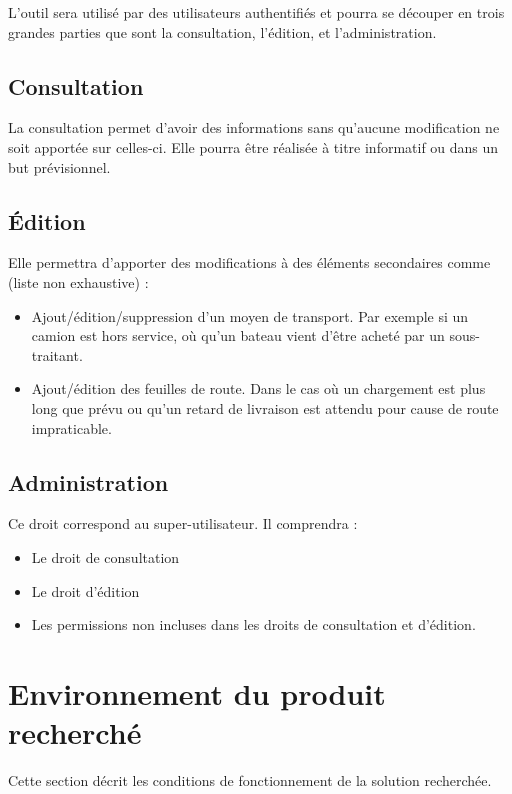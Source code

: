 L'outil sera utilisé par des utilisateurs authentifiés et pourra se découper en trois grandes parties que sont la consultation, l'édition, et l'administration.

\subsection{Consultation}
La consultation permet d'avoir des informations sans qu'aucune modification ne soit apportée sur celles-ci. Elle pourra être réalisée à titre informatif ou dans un but prévisionnel.

\subsection{Édition}
Elle permettra d'apporter des modifications à des éléments secondaires comme (liste non exhaustive) :
\begin{itemize}
\item Ajout/édition/suppression d'un moyen de transport. Par exemple si un camion est hors service, où qu'un bateau vient d'être acheté par un sous-traitant.
\item Ajout/édition des feuilles de route. Dans le cas où un chargement est plus long que prévu ou qu'un retard de livraison est attendu pour cause de route impraticable.
\end{itemize}

\subsection{Administration}
Ce droit correspond au super-utilisateur. Il comprendra :
\begin{itemize}
\item Le droit de consultation
\item Le droit d'édition
\item Les permissions non incluses dans les droits de consultation et d'édition.
\end{itemize}





\section{Environnement du produit recherché}
Cette section décrit les conditions de fonctionnement de la solution recherchée.

